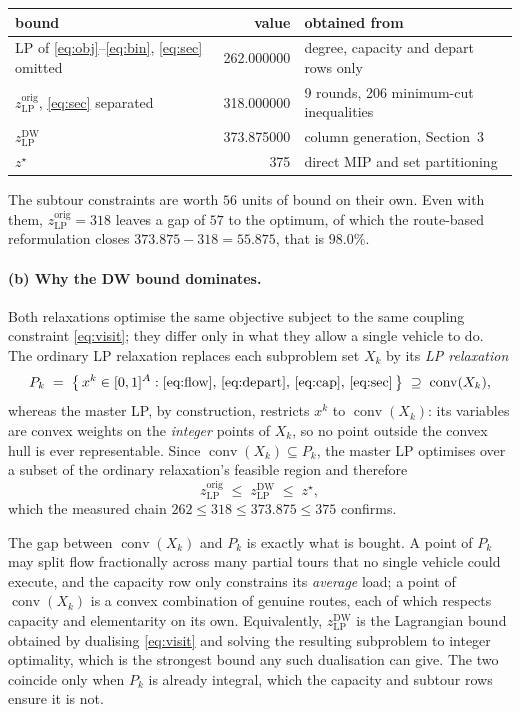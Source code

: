 \documentclass[11pt]{article}
\DeclareMathOperator{\conv}{conv}
\begin{document}
\begin{center}
\begin{tabular}{@{}lrl@{}}
\toprule
bound & value & obtained from\\
\midrule
LP of \eqref{eq:obj}--\eqref{eq:bin}, \eqref{eq:sec} omitted
  & 262.000000 & degree, capacity and depart rows only\\
$z^{\mathrm{orig}}_{\mathrm{LP}}$, \eqref{eq:sec} separated
  & 318.000000 & 9 rounds, 206 minimum-cut inequalities\\
$z^{\mathrm{DW}}_{\mathrm{LP}}$
  & 373.875000 & column generation, Section~3\\
$z^\star$ & 375 & direct MIP and set partitioning\\
\bottomrule
\end{tabular}
\end{center}

The subtour constraints are worth $56$ units of bound on their own.
Even with them, $z^{\mathrm{orig}}_{\mathrm{LP}} = 318$ leaves a gap of
$57$ to the optimum, of which the route-based reformulation closes
$373.875 - 318 = 55.875$, that is $98.0\%$.

\paragraph{(b) Why the DW bound dominates.}
Both relaxations optimise the same objective subject to the same
coupling constraint \eqref{eq:visit}; they differ only in what they
allow a single vehicle to do. The ordinary LP relaxation replaces each
subproblem set $X_k$ by its \emph{LP relaxation}
\[
  P_k \;=\; \bigl\{\, x^k \in [0,1]^{A} :
    \eqref{eq:flow},\,\eqref{eq:depart},\,\eqref{eq:cap},\,\eqref{eq:sec}
    \,\bigr\} \;\supseteq\; \conv(X_k),
\]
whereas the master LP, by construction, restricts $x^k$ to
$\conv(X_k)$: its variables are convex weights on the
\emph{integer} points of $X_k$, so no point outside the convex hull is
ever representable. Since $\conv(X_k) \subseteq P_k$, the master LP
optimises over a subset of the ordinary relaxation's feasible region
and therefore
\[
  z^{\mathrm{orig}}_{\mathrm{LP}}
  \;\le\; z^{\mathrm{DW}}_{\mathrm{LP}}
  \;\le\; z^\star ,
\]
which the measured chain $262 \le 318 \le 373.875 \le 375$ confirms.

The gap between $\conv(X_k)$ and $P_k$ is exactly what is bought. A
point of $P_k$ may split flow fractionally across many partial tours
that no single vehicle could execute, and the capacity row only
constrains its \emph{average} load; a point of $\conv(X_k)$ is a convex
combination of genuine routes, each of which respects capacity and
elementarity on its own. Equivalently,
$z^{\mathrm{DW}}_{\mathrm{LP}}$ is the Lagrangian bound obtained by
dualising \eqref{eq:visit} and solving the resulting subproblem to
integer optimality, which is the strongest bound any such dualisation
can give. The two coincide only when $P_k$ is already integral, which
the capacity and subtour rows ensure it is not.
\end{document}
